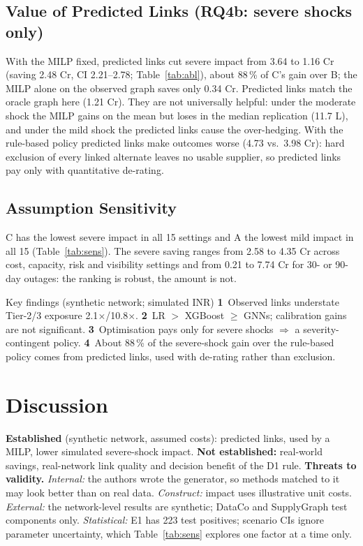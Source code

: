 \documentclass[conference]{IEEEtran}
\newcommand{\GapTwo}{2.1}
\newcommand{\GapThree}{10.8}
\newcommand{\AblCobs}{3.64}
\newcommand{\AblCpred}{1.16}
\newcommand{\AblOracle}{1.21}
\newcommand{\AblBpred}{4.73}
\newcommand{\AblBobs}{3.98}
\newcommand{\AblLinkVal}{2.48}
\newcommand{\AblLinkValL}{2.21}
\newcommand{\AblLinkValH}{2.78}
\newcommand{\AblLinkShare}{88}
\newcommand{\AblMilpVal}{0.34}
\newcommand{\AblModMed}{11.7}
\newcommand{\SensLo}{0.21}
\newcommand{\SensHi}{7.74}
\newcommand{\SensNdLo}{2.58}
\newcommand{\SensNdHi}{4.35}
\newcommand{\SensN}{15}
\begin{document}
\subsection{Value of Predicted Links (RQ4b: severe shocks only)}
With the MILP fixed, predicted links cut severe impact from \AblCobs{} to \AblCpred{} Cr (saving \AblLinkVal{} Cr, CI
\AblLinkValL--\AblLinkValH; Table~\ref{tab:abl}), about \AblLinkShare\,\% of C's gain over B; the MILP alone on the observed graph saves only
\AblMilpVal{} Cr. Predicted links match the oracle graph here (\AblOracle{} Cr). They are not universally helpful: under the moderate shock
the MILP gains on the mean but loses in the median replication (\AblModMed{} L), and under the mild shock the predicted links cause the
over-hedging. With the rule-based policy predicted links make outcomes worse (\AblBpred{} vs.\ \AblBobs{} Cr): hard exclusion of every linked alternate
leaves no usable supplier, so predicted links pay only with quantitative de-rating.

\subsection{Assumption Sensitivity}
C has the lowest severe impact in all \SensN{} settings and A the lowest mild impact in all \SensN{} (Table~\ref{tab:sens}).
The severe saving ranges from \SensNdLo{} to \SensNdHi{} Cr across cost, capacity, risk and visibility settings and from \SensLo{} to \SensHi{}
Cr for 30- or 90-day outages: the ranking is robust, the amount is not.

\begin{findings}{Key findings (synthetic network; simulated INR)}
\textbf{1}~Observed links understate Tier-2/3 exposure \GapTwo$\times$/\GapThree$\times$. \textbf{2}~LR $>$ XGBoost $\ge$ GNNs; calibration
gains are not significant. \textbf{3}~Optimisation pays only for severe shocks $\Rightarrow$ a severity-contingent policy. \textbf{4}~About
\AblLinkShare\,\% of the severe-shock gain over the rule-based policy comes from predicted links, used with de-rating rather than exclusion.
\end{findings}


\section{Discussion}
\textbf{Established} (synthetic network, assumed costs): predicted links, used by a MILP, lower simulated severe-shock impact.
\textbf{Not established:} real-world savings, real-network link quality and decision benefit of the D1 rule. \textbf{Threats to validity.} \emph{Internal:} the authors wrote the
generator, so methods matched to it may look better than on real data. \emph{Construct:} impact uses illustrative unit costs. \emph{External:} the
network-level results are synthetic; DataCo and SupplyGraph test components only. \emph{Statistical:} E1 has 223 test positives; scenario CIs
ignore parameter uncertainty, which Table~\ref{tab:sens} explores one factor at a time only.
\end{document}
